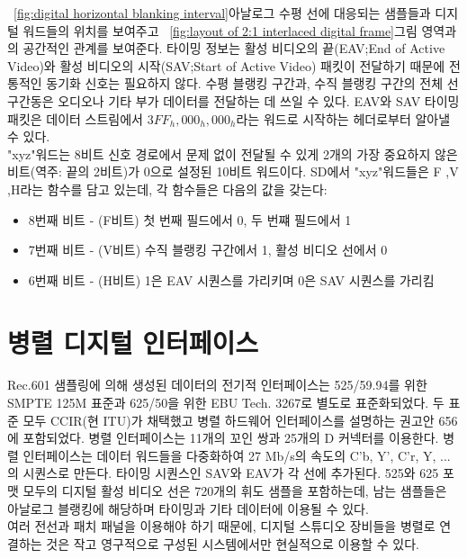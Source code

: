 \figurename~\ref{fig:digital horizontal blanking interval}\은 아날로그 수평 선에 대응되는 샘플들과 디지털 워드들의 위치를 보여주고 \figurename~\ref{fig:layout of 2:1 interlaced digital frame}\은 그림 영역과의 공간적인 관계를 보여준다.
타이밍 정보는 활성 비디오의 끝(EAV;End of Active Video)와 활성 비디오의 시작(SAV;Start of Active Video) 패킷이 전달하기 때문에 전통적인 동기화 신호는 필요하지 않다.
수평 블랭킹 구간과, 수직 블랭킹 구간의 전체 선 구간동은 오디오나 기타 부가 데이터를 전달하는 데 쓰일 수 있다. EAV와 SAV 타이밍 패킷은 데이터 스트림에서 $3FF_h, 000_h, 000_h$라는 워드로 시작하는 헤더로부터 알아낼 수 있다.
\\
"xyz"워드는 8비트 신호 경로에서 문제 없이 전달될 수 있게 2개의 가장 중요하지 않은 비트(역주: 끝의 2비트)가 0으로 설정된 10비트 워드이다.
SD에서 "xyz"워드들은 F ,V ,H라는 함수를 담고 있는데, 각 함수들은 다음의 값을 갖는다:
\begin{itemize}
    \item 8번째 비트 - (F비트) 첫 번째 필드에서 0, 두 번쨰 필드에서 1
    \item 7번째 비트 - (V비트) 수직 블랭킹 구간에서 1, 활성 비디오 선에서 0
    \item 6번째 비트 - (H비트) 1은 EAV 시퀀스를 가리키며 0은 SAV 시퀀스를 가리킴
\end{itemize}

\section{병렬 디지털 인터페이스}
Rec.601 샘플링에 의해 생성된 데이터의 전기적 인터페이스는 525/59.94를 위한 SMPTE 125M 표준과 625/50을 위한 EBU Tech. 3267로 별도로 표준화되었다. 두 표준 모두 CCIR(현 ITU)가 채택했고 병렬 하드웨어 인터페이스를 설명하는 권고안 656에 포함되었다.
병렬 인터페이스는 11개의 꼬인 쌍과 25개의 D 커넥터를 이용한다. 병렬 인터페이스는 데이터 워드들을 다중화하여 27 Mb/s의 속도의 C'b, Y', C'r, Y, ...의 시퀀스로 만든다. 타이밍 시퀀스인 SAV와 EAV가 각 선에 추가된다.
525와 625 포맷 모두의 디지털 활성 비디오 선은 720개의 휘도 샘플을 포함하는데, 남는 샘플들은 아날로그 블랭킹에 해당하며 타이밍과 기타 데이터에 이용될 수 있다.
\\
여러 전선과 패치 패널을 이용해야 하기 때문에, 디지털 스튜디오 장비들을 병렬로 연결하는 것은 작고 영구적으로 구성된 시스템에서만 현실적으로 이용할 수 있다.

